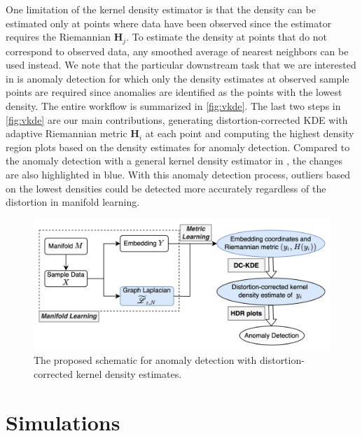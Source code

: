 \documentclass[12pt]{article}
\begin{document}
One limitation of the kernel density estimator is that the density can be estimated only at points where data have been observed since the estimator requires the Riemannian \(\bm{H}_j\). To estimate the density at points that do not correspond to observed data, any smoothed average of nearest neighbors can be used instead. We note that the particular downstream task that we are interested in is anomaly detection for which only the density estimates at observed sample points are required since anomalies are identified as the points with the lowest density. The entire workflow is summarized in \autoref{fig:vkde}. The last two steps in \autoref{fig:vkde} are our main contributions, generating distortion-corrected KDE with adaptive Riemannian metric \(\bm{H}_i\) at each point and computing the highest density region plots based on the density estimates for anomaly detection. Compared to the anomaly detection with a general kernel density estimator in \textcite{Cheng2021-dh}, the changes are also highlighted in blue. With this anomaly detection process, outliers based on the lowest densities could be detected more accurately regardless of the distortion in manifold learning.



\begin{figure}

{\centering \includegraphics[width=0.95\linewidth]{figures/DC-KDE} 

}

\caption{The proposed schematic for anomaly detection with distortion-corrected kernel density estimates.}\label{fig:vkde}
\end{figure}

\hypertarget{simulation}{%
\section{Simulations}\label{simulation}}
\end{document}
